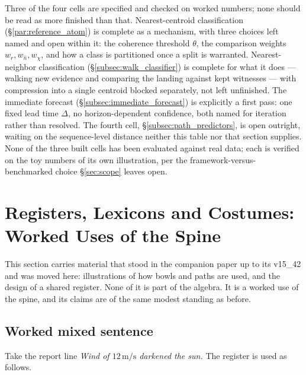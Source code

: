 \documentclass[12pt, a4paper]{article}
\begin{document}
Three of the four cells are specified and checked on worked numbers;
none should be read as more finished than that. Nearest-centroid
classification (\S\ref{par:reference_atom}) is complete as a
mechanism, with three choices left named and open within it: the
coherence threshold $\theta$, the comparison weights
$w_r,w_{\hat n},w_\chi$, and how a class is partitioned once a split
is warranted. Nearest-neighbor classification
(\S\ref{subsec:walk_classifier}) is complete for what it does ---
walking new evidence and comparing the landing against kept
witnesses --- with compression into a single centroid blocked
separately, not left unfinished. The immediate forecast
(\S\ref{subsec:immediate_forecast}) is explicitly a first pass: one
fixed lead time $\Delta$, no horizon-dependent confidence, both named
for iteration rather than resolved. The fourth cell,
\S\ref{subsec:path_predictors}, is open outright, waiting on the
sequence-level distance neither this table nor that section
supplies. None of the three built cells has been evaluated against
real data; each is verified on the toy numbers of its own
illustration, per the framework-versus-benchmarked choice
\S\ref{sec:scope} leaves open.


\section{Registers, Lexicons and Costumes: Worked Uses of the Spine}
\label{sec:registers_costumes}
This section carries material that stood in the companion paper up to its v15\_42 and was moved here: illustrations of how bowls and paths are used, and the design of a shared register. None of it is part of the algebra. It is a worked use of the spine, and its claims are of the same modest standing as before.

\subsection{Worked mixed sentence}
\label{subsec:mixed_sentence}
Take the report line \emph{Wind of $12\,\mathrm{m/s}$ darkened the sun.}
The register is used as follows.
\end{document}
